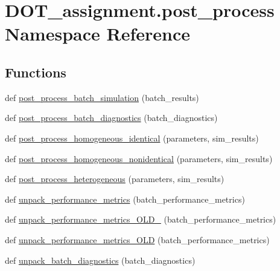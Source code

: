 \hypertarget{namespace_d_o_t__assignment_1_1post__process}{}\section{D\+O\+T\+\_\+assignment.\+post\+\_\+process Namespace Reference}
\label{namespace_d_o_t__assignment_1_1post__process}
\subsection*{Functions}
\begin{DoxyCompactItemize}
\item 
def \mbox{\hyperlink{namespace_d_o_t__assignment_1_1post__process_a03dba68b980b5e4cf8a5cec548972679}{post\+\_\+process\+\_\+batch\+\_\+simulation}} (batch\+\_\+results)
\item 
def \mbox{\hyperlink{namespace_d_o_t__assignment_1_1post__process_a173a9e602939fed90b0066290955da75}{post\+\_\+process\+\_\+batch\+\_\+diagnostics}} (batch\+\_\+diagnostics)
\item 
def \mbox{\hyperlink{namespace_d_o_t__assignment_1_1post__process_ae71799543cb6119a9650663972df1840}{post\+\_\+process\+\_\+homogeneous\+\_\+identical}} (parameters, sim\+\_\+results)
\item 
def \mbox{\hyperlink{namespace_d_o_t__assignment_1_1post__process_abf2ab504edf8d52d5efb83521560a3ce}{post\+\_\+process\+\_\+homogeneous\+\_\+nonidentical}} (parameters, sim\+\_\+results)
\item 
def \mbox{\hyperlink{namespace_d_o_t__assignment_1_1post__process_a0c208c013680627d4b74a80c959ff6e4}{post\+\_\+process\+\_\+heterogeneous}} (parameters, sim\+\_\+results)
\item 
def \mbox{\hyperlink{namespace_d_o_t__assignment_1_1post__process_ae3592c2931bef399ae8fac9769a969b2}{unpack\+\_\+performance\+\_\+metrics}} (batch\+\_\+performance\+\_\+metrics)
\item 
def \mbox{\hyperlink{namespace_d_o_t__assignment_1_1post__process_a75c21a161cd5e620becdc3e9caa5c779}{unpack\+\_\+performance\+\_\+metrics\+\_\+\+O\+L\+D\+\_}} (batch\+\_\+performance\+\_\+metrics)
\item 
def \mbox{\hyperlink{namespace_d_o_t__assignment_1_1post__process_a3ba1908baefc660e00475ade1e05011c}{unpack\+\_\+performance\+\_\+metrics\+\_\+\+O\+LD}} (batch\+\_\+performance\+\_\+metrics)
\item 
def \mbox{\hyperlink{namespace_d_o_t__assignment_1_1post__process_aa625e632ba6293d9db0884760ad1239c}{unpack\+\_\+batch\+\_\+diagnostics}} (batch\+\_\+diagnostics)

\end{DoxyCompactItemize}
